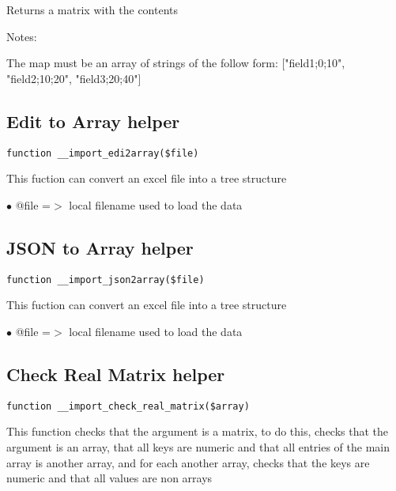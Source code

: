 \documentclass[a4paper]{book}
\begin{document}
Returns a matrix with the contents

Notes:

The map must be an array of strings of the follow form:
["field1;0;10", "field2;10;20", "field3;20;40"]

\hypertarget{toc168}{}
\subsection{Edit to Array helper}

\begin{lstlisting}
function __import_edi2array($file)
\end{lstlisting}

This fuction can convert an excel file into a tree structure

\begin{compactitem}
\item[\color{myblue}$\bullet$] @file =$>$ local filename used to load the data
\end{compactitem}

\hypertarget{toc169}{}
\subsection{JSON to Array helper}

\begin{lstlisting}
function __import_json2array($file)
\end{lstlisting}

This fuction can convert an excel file into a tree structure

\begin{compactitem}
\item[\color{myblue}$\bullet$] @file =$>$ local filename used to load the data
\end{compactitem}

\hypertarget{toc170}{}
\subsection{Check Real Matrix helper}

\begin{lstlisting}
function __import_check_real_matrix($array)
\end{lstlisting}

This function checks that the argument is a matrix, to do this, checks
that the argument is an array, that all keys are numeric and that all
entries of the main array is another array, and for each another array,
checks that the keys are numeric and that all values are non arrays
\end{document}
